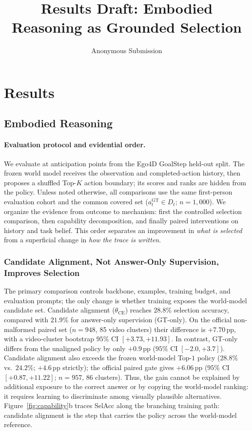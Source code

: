 \documentclass[letterpaper]{article}
\title{Results Draft: Embodied Reasoning as Grounded Selection}
\author{Anonymous Submission}
\affil{Anonymous Affiliation}
\newcommand{\obs}[1]{\textcolor{measuredblue}{#1}}
\newcommand{\pp}{\,\mathrm{pp}}
\begin{document}
\setlength{\emergencystretch}{1em}
\maketitle

\section{Results}
\subsection{Embodied Reasoning}
\label{sec:er-capability}

\paragraph{Evaluation protocol and evidential order.}
We evaluate at anticipation points from the Ego4D GoalStep held-out split.
The frozen world model receives the observation and completed-action history,
then proposes a shuffled Top-$K$ action boundary; its scores and ranks are
hidden from the policy.  Unless noted otherwise, all comparisons use the same
first-person evaluation cohort and the common covered set
($a_t^{\mathrm{GT}}\!\in D_t$; \obs{$n{=}1{,}000$}).
We organize the evidence from outcome to mechanism: first the controlled
selection comparison, then capability decomposition, and finally paired
interventions on history and task belief.  This order separates an improvement
in \emph{what is selected} from a superficial change in \emph{how the trace is
written}.

\subsubsection{Candidate Alignment, Not Answer-Only Supervision, Improves Selection}
\label{sec:er-selection}

The primary comparison controls backbone, examples, training budget, and
evaluation prompts; the only change is whether training exposes the
world-model candidate set.  Candidate alignment
($\theta_{\mathrm{CE}}$) reaches \obs{$28.8\%$} selection accuracy, compared
with \obs{$21.9\%$} for answer-only supervision (GT-only).  On the official
non-malformed paired set (\obs{$n{=}948$}, 85 video clusters) their difference
is \obs{$+7.70\pp$}, with a video-cluster bootstrap
\obs{$95\%$ CI $[+3.73,+11.93]$}.  In contrast, GT-only differs from the
unaligned policy by only \obs{$+0.9\pp$}
(\obs{$95\%$ CI $[-2.0,+3.7]$}).  Candidate alignment also exceeds the frozen
world-model Top-\obs{$1$} policy (\obs{$28.8\%$} vs.\ \obs{$24.2\%$};
\obs{$+4.6\pp$} strictly); the official paired gate gives \obs{$+6.06\pp$}
(\obs{$95\%$ CI $[+0.87,+11.22]$}; \obs{$n{=}957$}, 86 clusters).  Thus, the
gain cannot be explained by additional exposure to the correct answer or by
copying the world-model ranking: it requires learning to discriminate among
visually plausible alternatives.  Figure~\ref{fig:capability}b traces SelAcc
along the branching training path: candidate alignment is the step that
carries the policy across the world-model reference.
\end{document}
